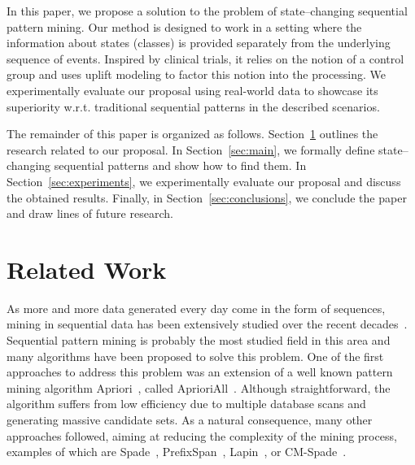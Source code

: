 \documentclass[runningheads,a4paper]{llncs}
\begin{document}
In this paper, we propose a solution to the problem of state--changing sequential pattern mining.
Our method is designed to work in a setting where the information about states (classes) is provided separately from the underlying sequence of events.
Inspired by clinical trials, it relies on the notion of a control group and uses uplift modeling to factor this notion into the processing.
We experimentally evaluate our proposal using real-world data to showcase its superiority w.r.t. traditional sequential patterns in the described scenarios.

The remainder of this paper is organized as follows.
Section~\ref{sec:related} outlines the research related to our proposal.
In Section~\ref{sec:main}, we formally define state--changing sequential patterns and show how to find them.
In Section~\ref{sec:experiments}, we experimentally evaluate our proposal and discuss the obtained results.
Finally, in Section~\ref{sec:conclusions}, we conclude the paper and draw lines of future research.

\section{Related Work}
\label{sec:related}
As more and more data generated every day come in the form of sequences, mining in sequential data has been extensively studied over the recent decades~\cite{Dong:2009,Fournier:2017}.
Sequential pattern mining is probably the most studied field in this area and many algorithms have been proposed to solve this problem.
One of the first approaches to address this problem was an extension of a well known pattern mining algorithm Apriori~\cite{Agrawal:1994}, called AprioriAll~\cite{Agrawal:1995}.
Although straightforward, the algorithm suffers from low efficiency due to multiple database scans and generating massive candidate sets.
As a natural consequence, many other approaches followed, aiming at reducing the complexity of the mining process, examples of which are Spade~\cite{Zaki:2001}, PrefixSpan~\cite{Pei:2004}, Lapin~\cite{Yang:2007}, or CM-Spade~\cite{Fournier:2014}.
\end{document}
